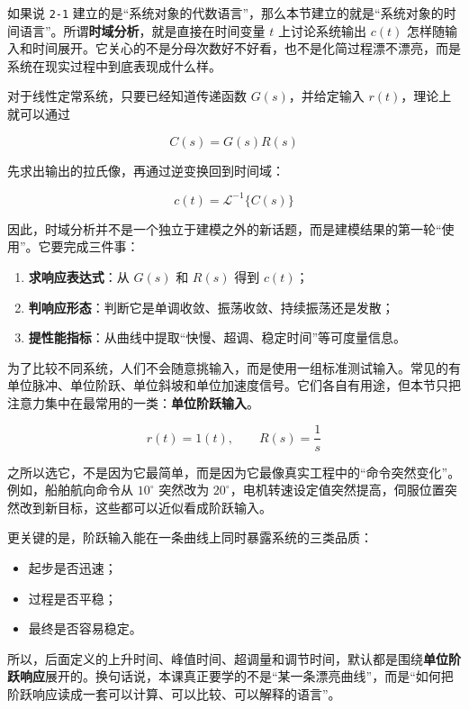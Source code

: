 \documentclass[
  11pt]{article}
\providecommand{\tightlist}{%
  \setlength{\itemsep}{0pt}\setlength{\parskip}{0pt}}
\begin{document}
如果说 \texttt{2-1}
建立的是``系统对象的代数语言''，那么本节建立的就是``系统对象的时间语言''。所谓\textbf{时域分析}，就是直接在时间变量
\(t\) 上讨论系统输出 \(c(t)\)
怎样随输入和时间展开。它关心的不是分母次数好不好看，也不是化简过程漂不漂亮，而是系统在现实过程中到底表现成什么样。

对于线性定常系统，只要已经知道传递函数 \(G(s)\)，并给定输入
\(r(t)\)，理论上就可以通过

\[
C(s)=G(s)R(s)
\]

先求出输出的拉氏像，再通过逆变换回到时间域：

\[
c(t)=\mathcal{L}^{-1}\{C(s)\}
\]

因此，时域分析并不是一个独立于建模之外的新话题，而是建模结果的第一轮``使用''。它要完成三件事：

\begin{enumerate}
\def\labelenumi{\arabic{enumi}.}
\tightlist
\item
  \textbf{求响应表达式}：从 \(G(s)\) 和 \(R(s)\) 得到 \(c(t)\)；
\item
  \textbf{判响应形态}：判断它是单调收敛、振荡收敛、持续振荡还是发散；
\item
  \textbf{提性能指标}：从曲线中提取``快慢、超调、稳定时间''等可度量信息。
\end{enumerate}

为了比较不同系统，人们不会随意挑输入，而是使用一组标准测试输入。常见的有单位脉冲、单位阶跃、单位斜坡和单位加速度信号。它们各自有用途，但本节只把注意力集中在最常用的一类：\textbf{单位阶跃输入}。

\[
r(t)=1(t), \qquad R(s)=\frac{1}{s}
\]

之所以选它，不是因为它最简单，而是因为它最像真实工程中的``命令突然变化''。例如，船舶航向命令从
\(10^\circ\) 突然改为
\(20^\circ\)，电机转速设定值突然提高，伺服位置突然改到新目标，这些都可以近似看成阶跃输入。

更关键的是，阶跃输入能在一条曲线上同时暴露系统的三类品质：

\begin{itemize}
\tightlist
\item
  起步是否迅速；
\item
  过程是否平稳；
\item
  最终是否容易稳定。
\end{itemize}

所以，后面定义的上升时间、峰值时间、超调量和调节时间，默认都是围绕\textbf{单位阶跃响应}展开的。换句话说，本课真正要学的不是``某一条漂亮曲线''，而是``如何把阶跃响应读成一套可以计算、可以比较、可以解释的语言''。
\end{document}
